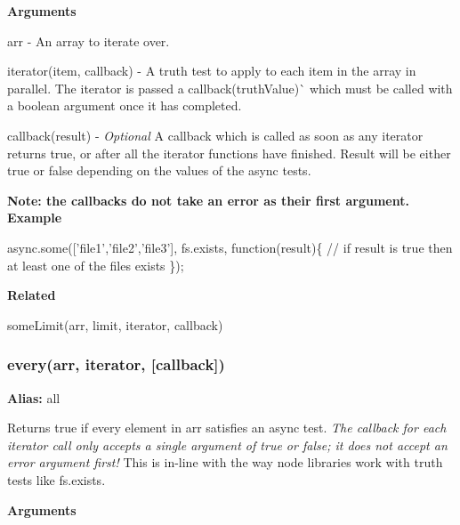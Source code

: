 {\bfseries Arguments}


\begin{DoxyItemize}
\item {\ttfamily arr} -\/ An array to iterate over.
\item {\ttfamily iterator(item, callback)} -\/ A truth test to apply to each item in the array in parallel. The iterator is passed a {\ttfamily callback(truth\+Value)}\`{} which must be called with a boolean argument once it has completed.
\item {\ttfamily callback(result)} -\/ {\itshape Optional} A callback which is called as soon as any iterator returns {\ttfamily true}, or after all the iterator functions have finished. Result will be either {\ttfamily true} or {\ttfamily false} depending on the values of the async tests.

{\bfseries Note\+: the callbacks do not take an error as their first argument.} {\bfseries Example}
\end{DoxyItemize}


\begin{DoxyCode}
async.some(['file1','file2','file3'], fs.exists, function(result)\{
    // if result is true then at least one of the files exists
\});
\end{DoxyCode}


{\bfseries Related}


\begin{DoxyItemize}
\item some\+Limit(arr, limit, iterator, callback) 


\end{DoxyItemize}

\label{_every}%
 \subsubsection*{every(arr, iterator, \mbox{[}callback\mbox{]})}

{\bfseries Alias\+:} {\ttfamily all}

Returns {\ttfamily true} if every element in {\ttfamily arr} satisfies an async test. {\itshape The callback for each {\ttfamily iterator} call only accepts a single argument of {\ttfamily true} or {\ttfamily false}; it does not accept an error argument first!} This is in-\/line with the way node libraries work with truth tests like {\ttfamily fs.\+exists}.

{\bfseries Arguments}



